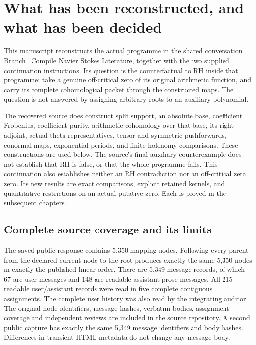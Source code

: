 \section{What has been reconstructed, and what has been decided}

This manuscript reconstructs the actual programme in the shared conversation
\href{https://chatgpt.com/share/6aa6bc6e-98cc-83eb-9343-e811c26d6631}{Branch
\textperiodcentered\ Compile Navier Stokes Literature}, together with the two
supplied continuation instructions. Its question is the counterfactual to RH
inside that programme: take a genuine off-critical zero of its original
arithmetic function, and carry its complete cohomological packet through the
constructed maps. The question is not answered by assigning arbitrary roots
to an auxiliary polynomial.

The recovered source does construct split support, an absolute base,
coefficient Frobenius, coefficient purity, arithmetic cohomology over that
base, its right adjoint, actual theta representatives, tensor and symmetric
pushforwards, conormal maps, exponential periods, and finite holonomy
comparisons. These constructions are used below. The source's final
auxiliary counterexample does not establish that RH is false, or that the
whole programme fails. This continuation also establishes neither an RH
contradiction nor an off-critical zeta zero. Its new results are exact
comparisons, explicit retained kernels, and quantitative restrictions on an
actual putative zero. Each is proved in the subsequent chapters.

\subsection{Complete source coverage and its limits}

The saved public response contains 5,350 mapping nodes. Following every
parent from the declared current node to the root produces exactly the same
5,350 nodes in exactly the published linear order. There are 5,349 message
records, of which 67 are user messages and 148 are readable assistant prose
messages. All 215 readable user/assistant records were read in five complete
contiguous assignments. The complete user history was also read by the
integrating auditor. The original node identifiers, message hashes,
verbatim bodies, assignment coverage and independent reviews are included
in the source repository. A second public capture has exactly the same
5,349 message identifiers and body hashes. Differences in transient HTML
metadata do not change any message body.

